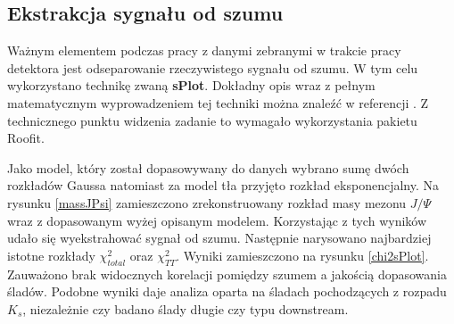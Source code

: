 \subsection{Ekstrakcja sygnału od szumu}
Ważnym elementem podczas pracy z danymi zebranymi w trakcie pracy detektora jest odseparowanie rzeczywistego sygnału od szumu. W tym celu wykorzystano technikę zwaną \textbf{sPlot}. Dokładny opis wraz z pełnym matematycznym wyprowadzeniem tej techniki można znaleźć w referencji \cite{sPlot}. Z technicznego punktu widzenia zadanie to wymagało wykorzystania pakietu Roofit. 

Jako model, który został dopasowywany do danych wybrano sumę dwóch rozkładów Gaussa natomiast za model tła przyjęto rozkład eksponencjalny. Na rysunku \ref{massJPsi} zamieszczono zrekonstruowany rozkład masy mezonu $J / \Psi$  wraz z dopasowanym wyżej opisanym modelem. Korzystając z tych wyników udało się wyekstrahować sygnał od szumu. Następnie narysowano najbardziej istotne rozkłady $\chi^2_{total}$ oraz $\chi^2_{TT}$. Wyniki zamieszczono na rysunku \ref{chi2sPlot}. Zauważono brak widocznych korelacji pomiędzy szumem a jakością dopasowania śladów. Podobne wyniki daje analiza oparta na śladach pochodzących z rozpadu $K_s$, niezależnie czy badano ślady długie czy typu downstream. 

